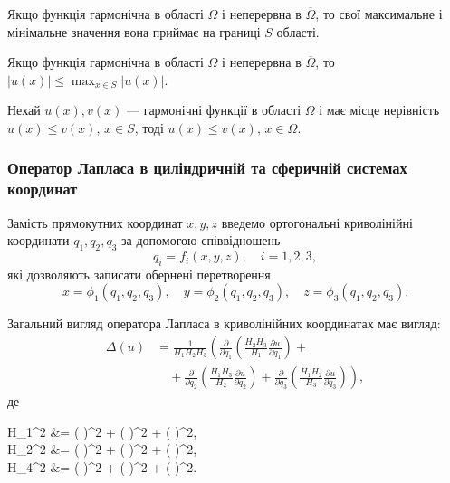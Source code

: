 \begin{corollary}
	Якщо функція гармонічна в області $\Omega$ і неперервна в $\overline{\Omega}$, то свої максимальне і мінімальне значення вона приймає на границі $S$ області.
\end{corollary}

\begin{corollary}
	Якщо функція гармонічна в області $\Omega$ і неперервна в $\overline{\Omega}$, то $|u(x)| \le \max_{x \in S} |u(x)|$.
\end{corollary}

\begin{corollary}
	Нехай $u(x), v(x)$ --- гармонічні функції в області $\Omega$ і має місце нерівність $u(x) \le v(x)$, $x \in S$, тоді $u(x) \le v(x)$, $x \in \Omega$.
\end{corollary}

\subsubsection{Оператор Лапласа в циліндричній та сферичній системах координат}

Замість прямокутних координат $x, y, z$ введемо ортогональні криволінійні координати $q_1, q_2, q_3$ за допомогою співвідношень
\begin{equation}
	q_i = f_i(x, y, z), \quad i = 1, 2, 3,
\end{equation}
які дозволяють записати обернені перетворення 
\begin{equation}
	\label{eq:4.5.16}
	x = \phi_1(q_1, q_2, q_3), \quad y = \phi_2(q_1, q_2, q_3), \quad z = \phi_3(q_1, q_2, q_3).
\end{equation}

Загальний вигляд оператора Лапласа в криволінійних координатах має вигляд:
\begin{equation}
	\begin{aligned}
		\Delta(u) &= \frac{1}{H_1H_2H_3} \left( \frac{\partial}{\partial q_1} \left( \frac{H_2H_3}{H_1} \frac{\partial u}{\partial q_1} \right) \right. + \\
		&\quad + \left. \frac{\partial}{\partial q_2} \left( \frac{H_1H_3}{H_2} \frac{\partial u}{\partial q_2} \right) + \frac{\partial}{\partial q_3} \left( \frac{H_1H_2}{H_3} \frac{\partial u}{\partial q_3} \right) \right),
	\end{aligned}
\end{equation}
де
\begin{system}
	\label{eq:4.5.18}
	H_1^2 &= \left(  \right)^2 + \left(  \right)^2 + \left(  \right)^2, \\
	H_2^2 &= \left(  \right)^2 + \left(  \right)^2 + \left(  \right)^2, \\
	H_4^2 &= \left(  \right)^2 + \left(  \right)^2 + \left(  \right)^2.
\end{system}

